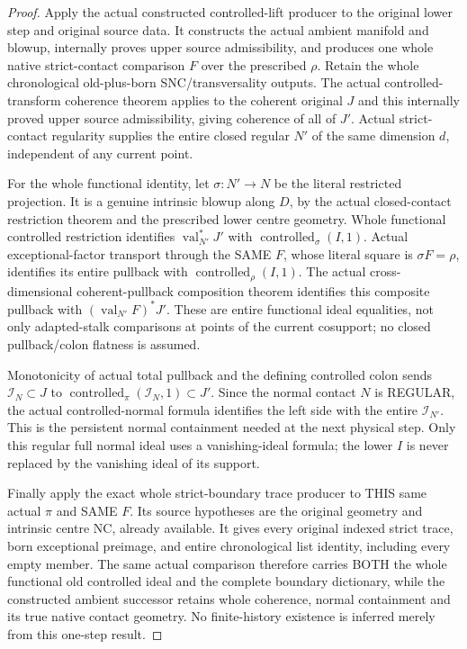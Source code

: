 \begin{proof}
Apply the actual constructed controlled-lift producer to the original lower
step and original source data. It constructs the actual ambient manifold and
blowup, internally proves upper source admissibility, and produces one whole
native strict-contact comparison $F$ over the prescribed $\rho$. Retain the
whole chronological old-plus-born SNC/transversality outputs. The actual
controlled-transform coherence theorem applies to the coherent original $J$
and this internally proved upper source admissibility, giving coherence of
all of $J'$. Actual strict-contact regularity supplies the entire closed
regular $N'$ of the same dimension $d$, independent of any current point.

For the whole functional identity, let $\sigma:N'\to N$ be the literal
restricted projection. It is a genuine intrinsic blowup along $D$, by the
actual closed-contact restriction theorem and the prescribed lower centre
geometry. Whole functional controlled restriction identifies
$\operatorname{val}_{N'}^*J'$ with
$\operatorname{controlled}_{\sigma}(I,1)$. Actual exceptional-factor
transport through the SAME $F$, whose literal square is $\sigma F=\rho$,
identifies its entire pullback with $\operatorname{controlled}_{\rho}(I,1)$.
The actual cross-dimensional coherent-pullback composition theorem identifies
this composite pullback with $(\operatorname{val}_{N'}F)^*J'$. These are
entire functional ideal equalities, not only adapted-stalk comparisons at
points of the current cosupport; no closed pullback/colon flatness is assumed.

Monotonicity of actual total pullback and the defining controlled colon sends
$\mathcal I_N\subset J$ to
$\operatorname{controlled}_{\pi}(\mathcal I_N,1)\subset J'$. Since the normal
contact $N$ is REGULAR, the actual controlled-normal formula identifies the
left side with the entire $\mathcal I_{N'}$. This is the persistent normal
containment needed at the next physical step. Only this regular full normal
ideal uses a vanishing-ideal formula; the lower $I$ is never replaced by the
vanishing ideal of its support.

Finally apply the exact whole strict-boundary trace producer to THIS same
actual $\pi$ and SAME $F$. Its source hypotheses are the original geometry
and intrinsic centre NC, already available. It gives every original indexed
strict trace, born exceptional preimage, and entire chronological list
identity, including every empty member. The same actual comparison therefore
carries BOTH the whole functional old controlled ideal and the complete
boundary dictionary, while the constructed ambient successor retains whole
coherence, normal containment and its true native contact geometry. No
finite-history existence is inferred merely from this one-step result.
\end{proof}
